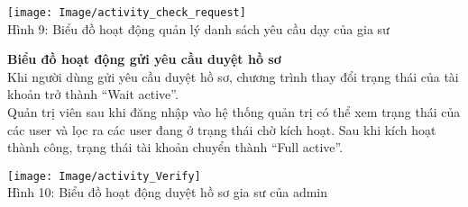 \documentclass[12pt,a4paper]{report}
\begin{document}
\begin{center}
    \begin{center}
     \texttt{[image: Image/activity\_check\_request]}\\
     Hình 9: Biểu đồ hoạt động quản lý danh sách yêu cầu dạy của gia sư
    \end{center}
\end{center}

\textbf{Biểu đồ hoạt động gửi yêu cầu duyệt hồ sơ}\\

Khi người dùng gửi yêu cầu duyệt hồ sơ, chương trình thay đổi trạng thái của
tài khoản trở thành “Wait active”.\\

Quản trị viên sau khi đăng nhập vào hệ thống quản trị có thể xem trạng thái
của các user và lọc ra các user đang ở trạng thái chờ kích hoạt. Sau khi kích hoạt
thành công, trạng thái tài khoản chuyển thành “Full active”.

\begin{center}
    \begin{center}
     \texttt{[image: Image/activity\_Verify]}\\
     Hình 10: Biểu đồ hoạt động duyệt hồ sơ gia sư của admin
    \end{center}
\end{center}

\newpage
\end{document}
